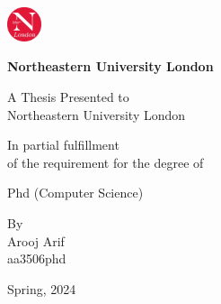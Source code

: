 \begin{minipage}{0.1\textwidth}
  \includegraphics[width=1cm]{nu_logo.jpeg}
\end{minipage}
\begin{minipage}{0.7\textwidth}\raggedleft
\textbf{\Large Northeastern University London}
\end{minipage}
\vfill
\vfill
\begin{center}

\LARGE {}

\end{center}

\vfill
\begin{center}\large
A Thesis Presented to\\
\vfill
\Large Northeastern University London
\end{center}

\vfill
\begin{center}\normalsize
In partial fulfillment\\
of the requirement for the degree of
\end{center}

\begin{center}\LARGE
Phd (Computer Science)
\end{center}

\vfill
\begin{center}


\normalsize By\\

\large Arooj Arif\\
\large aa3506phd\\
\end{center}
\vfill


\begin{center}
\Large Spring, 2024
\end{center}
